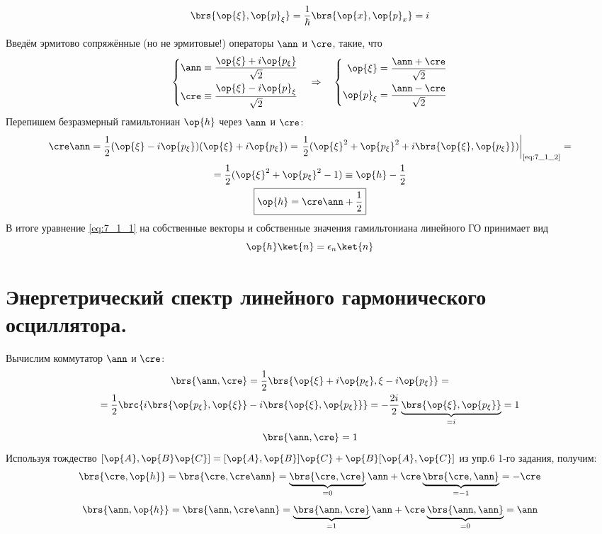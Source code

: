 \begin{equation}
\label{eq:7_1_2}
\brs{\op{\xi}, \op{p}_\xi} = \frac{1}{\hbar} \brs{\op{x}, \op{p}_x} = i
\end{equation}

Введём эрмитово сопряжённые (но не эрмитовые!) операторы $\ann$ и $\cre$, такие, что
$$
\left\{
\begin{aligned}
\ann \equiv \frac{\op{\xi} + i\op{p_\xi}}{\sqrt{2}} \\
\cre \equiv \frac{\op{\xi} - i\op{p}_\xi}{\sqrt{2}}
\end{aligned}
\right. ~~~ \Rightarrow ~~~ \left\{
\begin{aligned}
\op{\xi} = \frac{\ann + \cre}{\sqrt{2}} \\
\op{p}_\xi = \frac{\ann - \cre}{\sqrt{2}} \\
\end{aligned} \right.
$$%
%
Перепишем безразмерный гамильтониан $\op{h}$ через $\ann$ и $\cre$:
$$
\begin{gathered}
\cre\ann = \frac{1}{2} (\op{\xi} - i\op{p_\xi})(\op{\xi} + i\op{p_\xi}) = \left. \frac{1}{2}(\op{\xi}^2 + \op{p_\xi}^2 + i \brs{\op{\xi}, \op{p_\xi}}) \right|_{\text{\eqref{eq:7_1_2}}} =\\= \frac{1}{2} (\op{\xi}^2 + \op{p_\xi}^2 - 1) \equiv \op{h} - \frac{1}{2}
\\
\boxed{
  \op{h} = \cre\ann + \frac{1}{2}
}
\end{gathered}
$$%
%
В итоге уравнение \eqref{eq:7_1_1} на собственные векторы и собственные значения гамильтониана линейного ГО принимает вид
\begin{equation}
\label{eq:7_1_3}
\op{h} \ket{n} = \epsilon_n \ket{n}
\end{equation}

\section{Энергетрический спектр линейного гармонического осциллятора.}

Вычислим коммутатор $\ann$ и $\cre$:
$$
\begin{gathered}
\brs{\ann, \cre} = \frac{1}{2} \brs{ \op{\xi} + i\op{p_\xi},  \xi - i\op{p_\xi}} =\\= \frac{1}{2} \brc{ i\brs{\op{p_\xi}, \op{\xi}} - i \brs{\op{\xi}, \op{p_\xi}} } = -\frac{2i}{2} \underbrace{ \brs{\op{\xi}, \op{p_\xi}}}_{= i} = 1
\end{gathered}
$$
\begin{equation}
\label{eq:7_2_1}
\brs{\ann, \cre} = 1
\end{equation}%
%
Используя тождество $[\op{A}, \op{B}\op{C}] = [\op{A}, \op{B}] \op{C} + \op{B} [\op{A}, \op{C}]$ из упр.6 1-го задания, получим:
\begin{equation}
\label{eq:7_2_2}
\brs{\cre, \op{h}} = \brs{\cre, \cre\ann} = \underbrace{\brs{\cre, \cre}}_{= 0} \ann + \cre \underbrace{\brs{\cre, \ann}}_{= -1} = - \cre
\end{equation}%
%
\begin{equation}
\label{eq:7_2_3}
\brs{\ann, \op{h}} = \brs{\ann, \cre\ann} = \underbrace{\brs{\ann, \cre}}_{= 1} \ann + \cre \underbrace{\brs{\ann, \ann}}_{= 0} = \ann
\end{equation}

